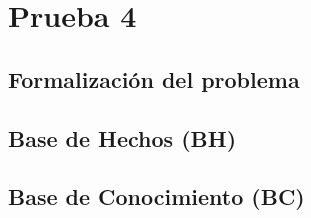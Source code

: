 \section{Prueba 4}

\subsection{Formalización del problema}

\subsection{Base de Hechos (BH)}

\subsection{Base de Conocimiento (BC)}